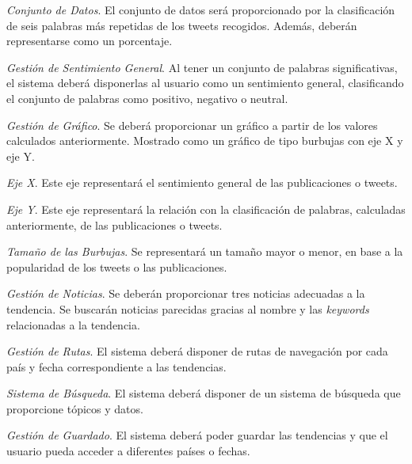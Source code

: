 \begin{enumerate}
{\begin{enumerate}
{\begin{enumerate}
{                \item
                \textit{Conjunto de Datos}. El conjunto de datos será proporcionado por la clasificación de seis palabras más repetidas de los tweets recogidos. Además, deberán representarse como un porcentaje.
                }\end{enumerate}
            }\end{enumerate}
        \item
        \textit{Gestión de Sentimiento General}. Al tener un conjunto de palabras significativas, el sistema deberá disponerlas al usuario como un sentimiento general, clasificando el conjunto de palabras como positivo, negativo o neutral.
        \begin{enumerate}{\renewcommand{\labelenumii}{R.F. \arabic{enumi}.\arabic{enumii}}
            \item
            \textit{Gestión de Gráfico}. Se deberá proporcionar un gráfico a partir de los valores calculados anteriormente. Mostrado como un gráfico de tipo burbujas con eje X y eje Y.
            \begin{enumerate}{\renewcommand{\labelenumiii}{R.F. \arabic{enumi}.\arabic{enumii}.\arabic{enumiii}}
                \item
                \textit{Eje X}. Este eje representará el sentimiento general de las publicaciones o tweets.
                \item
                \textit{Eje Y}. Este eje representará la relación con la clasificación de palabras, calculadas anteriormente, de las publicaciones o tweets.
                \item
                \textit{Tamaño de las Burbujas}. Se representará un tamaño mayor o menor, en base a la popularidad de los tweets o las publicaciones.
                }\end{enumerate}
            }\end{enumerate}
        \item
        \textit{Gestión de Noticias}. Se deberán proporcionar tres noticias adecuadas a la tendencia. Se buscarán noticias parecidas gracias al nombre y las \textit{keywords} relacionadas a la tendencia.
        \item
        \textit{Gestión de Rutas}. El sistema deberá disponer de rutas de navegación por cada país y fecha correspondiente a las tendencias.
        \item
        \textit{Sistema de Búsqueda}. El sistema deberá disponer de un sistema de búsqueda que proporcione tópicos y datos. 
        \item
        \textit{Gestión de Guardado}. El sistema deberá poder guardar las tendencias y que el usuario pueda acceder a diferentes países o fechas.
}\end{enumerate}

